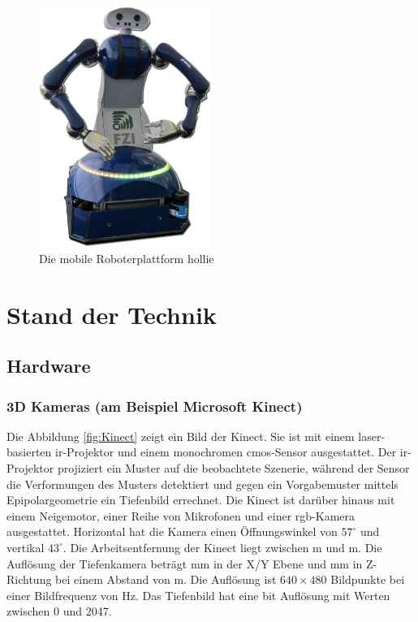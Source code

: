 \begin{figure}[h]
	\center
	\includegraphics[width=0.5\textwidth]{graphics/hollie}
	\caption{\label{fig:hollie} Die mobile Roboterplattform \gls{hollie}}
\end{figure}



\section{Stand der Technik}
\label{stand_der_technik_sec}
\authorsection{\editorabel}

\subsection{Hardware}

\subsubsection{3D Kameras (am Beispiel Microsoft Kinect)}
Die Abbildung \ref{fig:Kinect} zeigt ein Bild der Kinect.
Sie ist mit einem laser-basierten \gls{ir}-Projektor und einem monochromen \gls{cmos}-Sensor ausgestattet.
Der \gls{ir}-Projektor projiziert ein Muster auf die beobachtete Szenerie, während der  Sensor die Verformungen des Musters detektiert und gegen ein Vorgabemuster mittels Epipolargeometrie ein Tiefenbild errechnet.
Die Kinect ist darüber hinaus mit einem Neigemotor, einer Reihe von Mikrofonen und einer \gls{rgb}-Kamera ausgestattet.
Horizontal hat die Kamera einen Öffnungswinkel von $57^\circ$ und vertikal $43^\circ$.
Die Arbeitsentfernung der Kinect liegt zwischen \unit[0,8]{m} und \unit[3,5]{m}.
Die Auflösung der Tiefenkamera beträgt \unit[3]{mm} in der X/Y Ebene und \unit[10]{mm} in Z-Richtung bei einem Abstand von \unit[2]{m}.
Die Auflösung ist $640 \times 480$ Bildpunkte bei einer Bildfrequenz von \unit[30]{Hz}.
Das Tiefenbild hat eine \unit[11]{bit} Auflösung mit Werten zwischen 0 und 2047.

